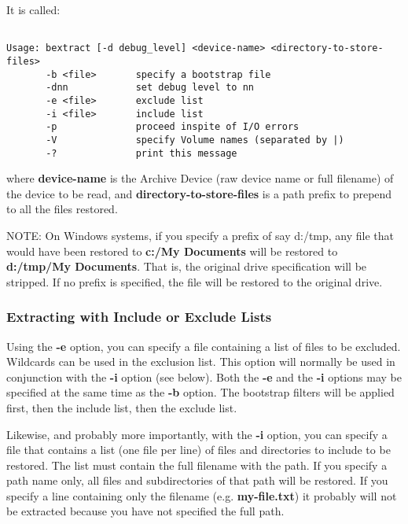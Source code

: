 It is called: 

\footnotesize
\begin{verbatim}
 
Usage: bextract [-d debug_level] <device-name> <directory-to-store-files>
       -b <file>       specify a bootstrap file
       -dnn            set debug level to nn
       -e <file>       exclude list
       -i <file>       include list
       -p              proceed inspite of I/O errors
       -V              specify Volume names (separated by |)
       -?              print this message
\end{verbatim}
\normalsize

where {\bf device-name} is the Archive Device (raw device name or full
filename) of the device to be read, and {\bf directory-to-store-files} is a
path prefix to prepend to all the files restored. 

NOTE: On Windows systems, if you specify a prefix of say d:/tmp, any file that
would have been restored to {\bf c:/My Documents} will be restored to {\bf
d:/tmp/My Documents}. That is, the original drive specification will be
stripped. If no prefix is specified, the file will be restored to the original
drive. 

\subsubsection*{Extracting with Include or Exclude Lists}

Using the {\bf -e} option, you can specify a file containing a list of files
to be excluded. Wildcards can be used in the exclusion list. This option will
normally be used in conjunction with the {\bf -i} option (see below). Both the
{\bf -e} and the {\bf -i} options may be specified at the same time as the
{\bf -b} option. The bootstrap filters will be applied first, then the include
list, then the exclude list. 

Likewise, and probably more importantly, with the {\bf -i} option, you can
specify a file that contains a list (one file per line) of files and
directories to include to be restored. The list must contain the full filename
with the path. If you specify a path name only, all files and subdirectories
of that path will be restored. If you specify a line containing only the
filename (e.g. {\bf my-file.txt}) it probably will not be extracted because
you have not specified the full path. 

